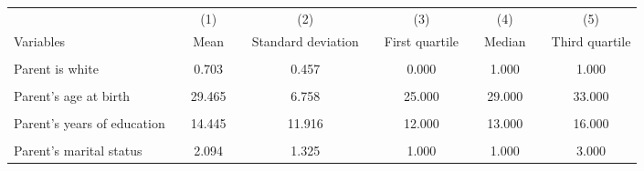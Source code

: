 \begin{tabular}{rrrrrrrrrrr}
\toprule
          &           &           &           &           &           &           &           &           &           &  \\
\midrule
          &           & \multicolumn{1}{c}{(1)} &           & \multicolumn{1}{c}{(2)} &           & \multicolumn{1}{c}{(3)} &           & \multicolumn{1}{c}{(4)} &           & \multicolumn{1}{c}{(5)} \\
\multicolumn{1}{l}{Variables} &           & \multicolumn{1}{c}{Mean} &           & \multicolumn{1}{c}{Standard deviation} &           & \multicolumn{1}{c}{First quartile} &           & \multicolumn{1}{c}{Median} &           & \multicolumn{1}{c}{Third quartile} \\
\cmidrule{1-1}\cmidrule{3-3}\cmidrule{5-5}\cmidrule{7-7}\cmidrule{9-9}\cmidrule{11-11}          &           &           &           &           &           &           &           &           &           &  \\
\multicolumn{1}{l}{Parent is white} &           & \multicolumn{1}{c}{0.703} &           & \multicolumn{1}{c}{0.457} &           & \multicolumn{1}{c}{0.000} &           & \multicolumn{1}{c}{1.000} &           & \multicolumn{1}{c}{1.000} \\
          &           &           &           &           &           &           &           &           &           &  \\
\multicolumn{1}{l}{Parent's age at birth} &           & \multicolumn{1}{c}{29.465} &           & \multicolumn{1}{c}{6.758} &           & \multicolumn{1}{c}{25.000} &           & \multicolumn{1}{c}{29.000} &           & \multicolumn{1}{c}{33.000} \\
          &           &           &           &           &           &           &           &           &           &  \\
\multicolumn{1}{l}{Parent's years of education} &           & \multicolumn{1}{c}{14.445} &           & \multicolumn{1}{c}{11.916} &           & \multicolumn{1}{c}{12.000} &           & \multicolumn{1}{c}{13.000} &           & \multicolumn{1}{c}{16.000} \\
          &           &           &           &           &           &           &           &           &           &  \\
\multicolumn{1}{l}{Parent's marital status} &           & \multicolumn{1}{c}{2.094} &           & \multicolumn{1}{c}{1.325} &           & \multicolumn{1}{c}{1.000} &           & \multicolumn{1}{c}{1.000} &           & \multicolumn{1}{c}{3.000} \\

\end{tabular}

